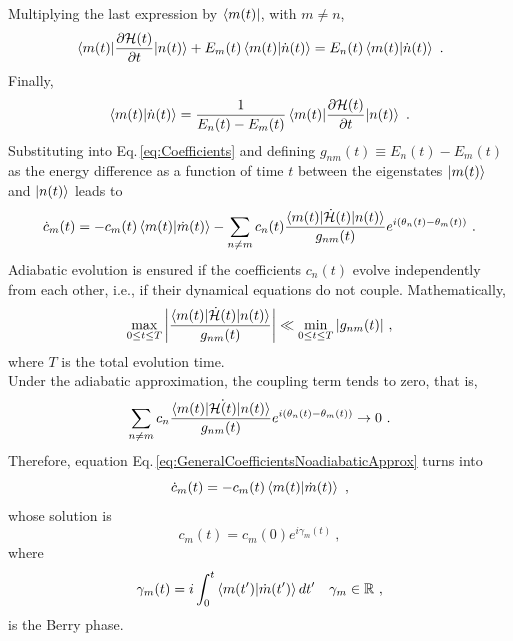 Multiplying the last expression by $\bra{m(t)}$, with $m\neq n$,
\begin{equation}
    \braket{m(t)|\frac{\partial\mathcal{H}(t)}{\partial t}|n(t)} + E_{m}(t)\braket{m(t)|\dot{n}(t)} = E_{n}(t)\braket{m(t)|\dot{n}(t)}\ .
\end{equation}
Finally,
\begin{equation}
    \braket{m(t)|\dot{n}(t)} = \frac{1}{E_{n}(t)-E_{m}(t)}\braket{m(t)|\frac{\partial \mathcal{H}(t)}{\partial t}|n(t)}\ .
\end{equation}
Substituting into Eq.\,\eqref{eq:Coefficients} and defining $g_{nm}(t)\equiv E_{n}(t) - E_{m}(t)$ as the energy difference as a function of time $t$ between the eigenstates $\ket{m(t)}$ and $\ket{n(t)}$ leads to
\begin{equation}
\label{eq:GeneralCoefficientsNoadiabaticApprox}
    \dot{c}_{m}(t) = -c_{m}(t) \braket{m(t)|\dot{m}(t)} - \sum_{n\neq m} c_{n}(t)\frac{\braket{m(t)|\dot{\mathcal{H}}(t)|n(t)}}{g_{nm}(t)}e^{i\left(\theta_{n}(t) - \theta_{m}(t)\right)}\ .
\end{equation}
Adiabatic evolution is ensured if the coefficients $c_{n}(t)$ evolve independently from each other, i.e., if their dynamical equations do not couple. Mathematically,
\begin{equation}
    \max_{0 \leq t \leq T} \abs{\frac{\braket{m(t)|\dot{\mathcal{H}}(t)|n(t)}}{g_{nm}(t)}} \ll \min_{0\leq t \leq T} \abs{g_{nm}(t)}\ ,
\end{equation}
where $T$ is the total evolution time.\\ 
Under the adiabatic approximation, the coupling term tends to zero, that is,
\begin{equation}
    \sum_{n\neq m} c_{n}\frac{\braket{m(t)|\dot{\mathcal{H}(t)}|n(t)}}{g_{nm}(t)}e^{i\left(\theta_{n}(t) - \theta_{m}(t)\right)} \to 0\ .
\end{equation}
Therefore, equation Eq.\,\eqref{eq:GeneralCoefficientsNoadiabaticApprox} turns into
\begin{equation}
    \dot{c}_{m}(t) = -c_{m}(t)\braket{m(t)|\dot{m}(t)}\ ,
\end{equation}
whose solution is
\begin{equation}
    c_{m}(t) = c_{m}(0)e^{i\gamma_{m}(t)}\ ,
\end{equation}
where
\begin{equation}
    \gamma_{m}(t) = i\int_{0}^{t}\braket{m(t^{\prime})|\dot{m}(t^{\prime})}dt^{\prime} \quad \gamma_{m}\in \mathbb{R}\ ,
\end{equation}
is the Berry phase.

